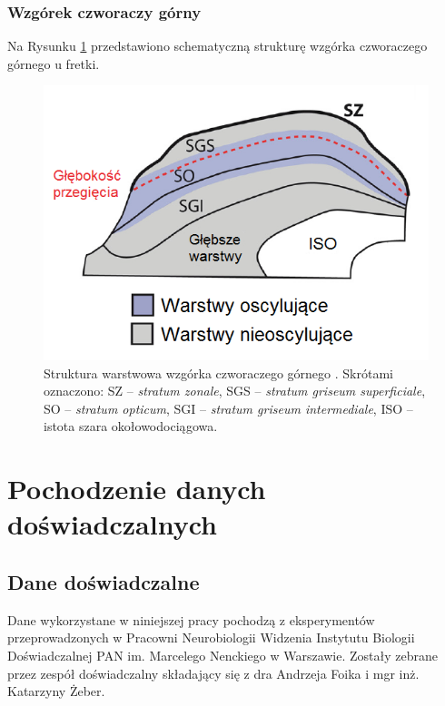 \documentclass{pracamgr}
\begin{document}
	\subsection{Wzgórek czworaczy górny}
	Na Rysunku \ref{rys:SC_warstwy} przedstawiono schematyczną strukturę wzgórka czworaczego górnego u fretki. 
	\begin{figure}[htbp]
		\begin{center}
			\includegraphics[scale=0.55]{SC_warstwy.png}
		\end{center}
		\caption{Struktura warstwowa wzgórka czworaczego górnego \citep{SC_warstwy}. Skrótami oznaczono: SZ -- \textit{stratum zonale}, SGS -- \textit{stratum griseum superficiale}, SO -- \textit{stratum opticum}, SGI -- \textit{stratum griseum intermediale}, ISO -- istota szara okołowodociągowa.}
		\label{rys:SC_warstwy}
	\end{figure}

	\chapter{Pochodzenie danych doświadczalnych}
	\section{Dane doświadczalne}
	Dane wykorzystane w niniejszej pracy pochodzą z eksperymentów przeprowadzonych w Pracowni Neurobiologii Widzenia Instytutu Biologii Doświadczalnej PAN im. Marcelego Nenckiego w Warszawie. Zostały zebrane przez zespół doświadczalny składający się z dra Andrzeja Foika i mgr inż. Katarzyny Żeber.
	
\end{document}
